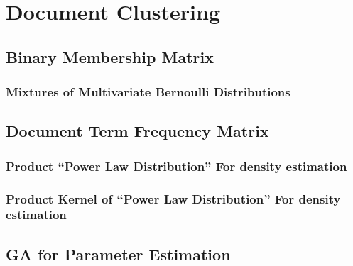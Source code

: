 
\chapter{Document Clustering}


\section{Binary Membership Matrix}


\subsection{Mixtures of Multivariate Bernoulli Distributions}


\section{Document Term Frequency Matrix}


\subsection{Product \textquotedblleft{}Power Law Distribution\textquotedblright{}
\textendash{} For density estimation}


\subsection{Product Kernel of \textquotedblleft{}Power Law Distribution\textquotedblright{}
\textendash{} For density estimation}


\section{GA for Parameter Estimation}
